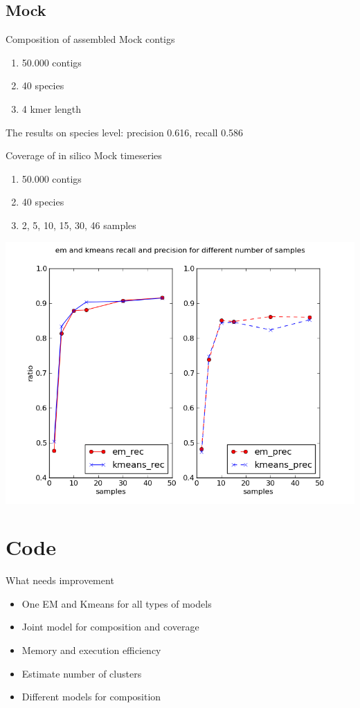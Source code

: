 \documentclass{beamer}
\begin{document}
\subsection{Mock}
\begin{frame}{Composition of assembled Mock contigs}
\begin{enumerate}
\item 50.000 contigs
\item 40 species
\item 4 kmer length
\end{enumerate}
The results on species level: precision 0.616, recall 0.586
\end{frame}

\begin{frame}{Coverage of in silico Mock timeseries}
\begin{enumerate}
\item 50.000 contigs
\item 40 species
\item 2, 5, 10, 15, 30, 46 samples
\end{enumerate}
\begin{center}
\includegraphics[width=0.7\linewidth]{./coverage-mock}\\
\end{center}
\end{frame}

\section{Code}
\begin{frame}{What needs improvement}
\begin{itemize}
\item One EM and Kmeans for all types of models
\item Joint model for composition and coverage
\item Memory and execution efficiency
\item Estimate number of clusters
\item Different models for composition
\end{itemize}
\end{frame}
\end{document}
